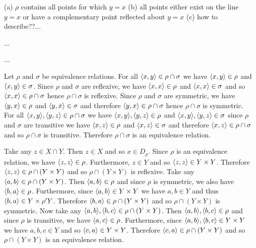 \documentclass[12pt]{book}
\begin{document}
\renewcommand{\labelenumi}{1.7.\arabic{enumi}}
\begin{enumerate}
{(a) $\rho$ contains all points for which $y=x$ (b)  all points either exist on the line $y=x$ or have a complementary point reflected about $y=x$ (c) how to describe??...}

{...}

{...}

{Let $\rho$ and $\sigma$ be equivalence relations. For all $\langle x,y\rangle\in \rho \cap \sigma$ we have $\langle x,y\rangle\in\rho$ and $\langle x,y\rangle\in\sigma$. Since $\rho$ and $\sigma$ are reflexive, we have $\langle x,x\rangle\in\rho$ and $\langle x,x\rangle\in\sigma$ and so $\langle x,x\rangle\in\rho\cap\sigma$ hence $\rho \cap \sigma$ is reflexive. Since $\rho$ and $\sigma$ are symmetric, we have $\langle y,x\rangle\in\rho$ and $\langle y,x\rangle\in\sigma$ and therefore $\langle y,x\rangle\in\rho\cap\sigma$ hence $\rho \cap \sigma$ is symmetric. For all $\langle x,y\rangle,\langle y,z\rangle\in \rho \cap \sigma$ we have $\langle x,y\rangle,\langle y,z\rangle\in\rho$ and $\langle x,y\rangle,\langle y,z\rangle\in\sigma$ since $\rho$ and $\sigma$ are transitive we have $\langle x,z\rangle\in\rho$ and $\langle x,z\rangle\in\sigma$ and therefore $\langle x,z\rangle\in\rho \cap \sigma$ and so $\rho \cap \sigma$ is transitive. Therefore $\rho \cap \sigma$ is an equivalence relation.}

{Take any $z\in X\cap Y$. Then $z\in X$ and so $x\in D_{\rho}$. Since $\rho$ is an equivalence relation, we have $\langle z,z\rangle\in\rho$. Furthermore, $z\in Y$ and so $\langle z,z\rangle\in Y\times Y$. Therefore $\langle z,z\rangle\in\rho \cap (Y \times Y)$ and so $\rho \cap (Y \times Y)$ is reflexive. Take any $\langle a,b\rangle\in\rho \cap (Y \times Y)$. Then $\langle a,b\rangle\in\rho$ and since $\rho$ is symmetric, we also have $\langle b,a\rangle\in\rho$. Furthermore, since $\langle a,b\rangle\in Y\times Y$ we have $a,b\in Y$ and thus $\langle b,a\rangle\in Y\times\rho' Y$. Therefore $\langle b,a\rangle\in\rho \cap (Y \times Y)$ and so $\rho \cap (Y \times Y)$ is symmetric. Now take any $\langle a,b\rangle,\langle b,c\rangle\in\rho \cap (Y \times Y)$. Then $\langle a,b\rangle,\langle b,c\rangle \in \rho$ and since $\rho$ is transitive, we have $\langle a,c\rangle\in\rho$. Furthermore, since $\langle a,b\rangle,\langle b,c\rangle\in Y\times Y$ we have $a,b,c\in Y$ and so $\langle c,a\rangle\in Y\times Y$. Therefore $\langle c,a\rangle\in\rho \cap (Y \times Y)$ and so $\rho \cap (Y \times Y)$ is an equivalence relation.}


\end{enumerate}
\end{document}
